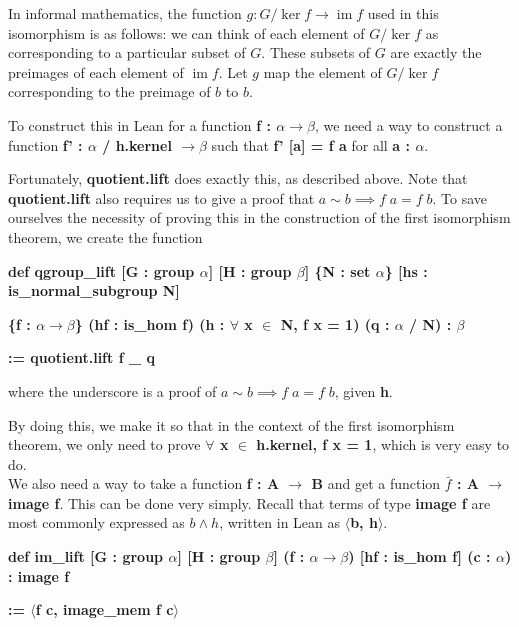 \documentclass[runningheads,a4paper]{llncs}
\renewcommand{\a}{\alpha}
\renewcommand{\b}{\beta}
\DeclareMathOperator{\im}{im}
\renewcommand{\-}{\setminus}
\begin{document}
In informal mathematics, the function $g : G / \ker f \to \im f$ used in this isomorphism is as follows: we can think of each element of $G / \ker f$ as corresponding to a particular subset of $G$. These subsets of $G$ are exactly the preimages of each element of $\im f$. Let $g$ map the element of $G / \ker f$ corresponding to the preimage of $b$ to $b$.

To construct this in Lean for a function \textbf{f : $\a \to \b$}, we need a way to construct a function \textbf{f' : $\a$ / h.kernel $\to \b$} such that \textbf{f' [a] = f a} for all \textbf{a : $\a$}.

Fortunately, \textbf{quotient.lift} does exactly this, as described above. Note that \textbf{quotient.lift} also requires us to give a proof that $a \sim b \implies f\; a = f\; b$. To save ourselves the necessity of proving this in the construction of the first isomorphism theorem, we create the function

\vspace{2 mm}
\hspace{1 em}\textbf{def qgroup\_lift [G : group $\a$] [H : group $\b$] \{N : set $\a$\} [hs : is\_normal\_subgroup N]}

\hspace{3 em}\textbf{\{f : $\a \to \b$\} (hf : is\_hom f) (h : $\forall$ x $\in$ N, f x = 1) (q : $\a$ / N) : $\b$}

\hspace{3 em}\textbf{:= quotient.lift f \_ q}
\vspace{2 mm}

where the underscore is a proof of $a \sim b \implies f\; a = f\; b$, given \textbf{h}.

By doing this, we make it so that in the context of the first isomorphism theorem, we only need to prove \textbf{$\forall$ x $\in$ h.kernel, f x = 1}, which is very easy to do.\\

We also need a way to take a function \textbf{f : A $\to$ B} and get a function \textbf{$\bar f$ : A $\to$ image f}. This can be done very simply. Recall that terms of type \textbf{image f} are most commonly expressed as $b \land h$, written in Lean as \textbf{$\langle$b, h$\rangle$}.

\vspace{2 mm}
\hspace{2 em}\textbf{def im\_lift [G : group $\a$] [H : group $\b$] (f : $\a \to \b$) [hf : is\_hom f] (c : $\a$) : image f}

\hspace{4 em}\textbf{:= $\langle$f c, image\_mem f c$\rangle$}
\vspace{2 mm}
\end{document}
